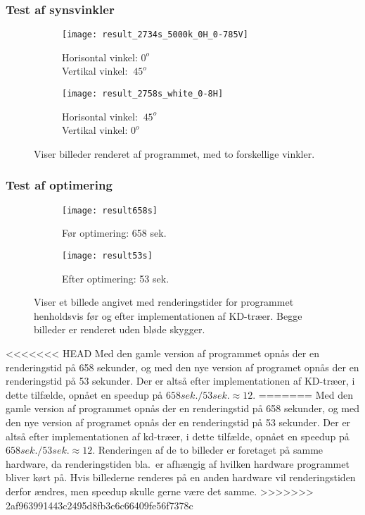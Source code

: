 \subsubsection{Test af synsvinkler}
\begin{figure}[H]
\centering
\begin{subfigure}{.5\textwidth}
  \centering
  \texttt{[image: result\_2734s\_5000k\_0H\_0-785V]}
  \caption{Horisontal vinkel: $0^o$ \\ Vertikal vinkel: $~45^o$}
  \label{fig:one}
\end{subfigure}%
\begin{subfigure}{.5\textwidth}
  \centering
  \texttt{[image: result\_2758s\_white\_0-8H]}
  \caption{Horisontal vinkel: $~45^o$ \\ Vertikal vinkel: $0^o$}
  \label{fig:two}
\end{subfigure}
\caption{Viser billeder renderet af programmet, med to forskellige vinkler.}
\label{fig:synsvinkel}
\end{figure}

\subsubsection{Test af optimering}
\begin{figure}[H]
\centering
\begin{subfigure}{.5\textwidth}
  \centering
  \texttt{[image: result658s]}
  \caption{Før optimering: 658 sek.}
  \label{fig:slow}
\end{subfigure}%
\begin{subfigure}{.5\textwidth}
  \centering
  \texttt{[image: result53s]}
  \caption{Efter optimering: 53 sek.}
  \label{fig:fast}
\end{subfigure}
\caption{Viser et billede angivet med renderingstider for programmet henholdsvis før og efter implementationen af KD-træer. Begge billeder er renderet uden bløde skygger.}
\label{fig:optimering}
\end{figure}

<<<<<<< HEAD
Med den gamle version af programmet opnås der en renderingstid på 658 sekunder, og med den nye version af programet opnås der en renderingstid på 53 sekunder. Der er altså efter implementationen af KD-træer, i dette tilfælde, opnået en speedup på $658 sek./53 sek. \approx 12$.
=======
Med den gamle version af programmet opnås der en renderingstid på 658 sekunder, og med den nye version af programet opnås der en renderingstid på 53 sekunder. Der er altså efter implementationen af kd-træer, i dette tilfælde, opnået en speedup på $658 sek./53 sek. \approx 12$. Renderingen af de to billeder er foretaget på samme hardware, da renderingstiden bla.\ er afhængig af hvilken hardware programmet bliver kørt på. Hvis billederne renderes på en anden hardware vil renderingstiden derfor ændres, men speedup skulle gerne være det samme. 
>>>>>>> 2af963991443c2495d8fb3c6c66409fe56f7378c

